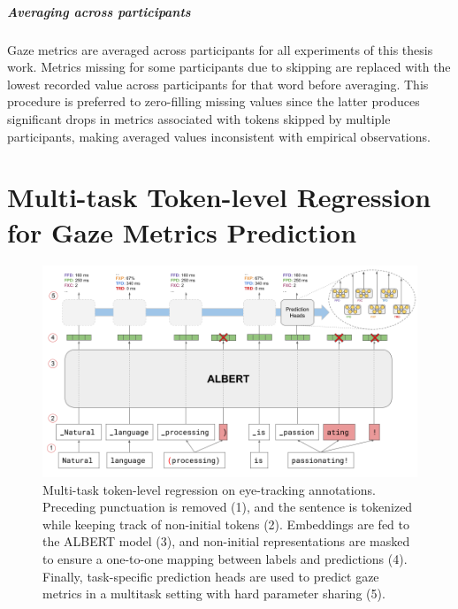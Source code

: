 \documentclass[a4paper, nobind]{templates/ociamthesis}
\begin{document}
\paragraph{Averaging across participants} Gaze metrics are averaged across participants for all experiments of this thesis work. Metrics missing for some participants due to skipping are replaced with the lowest recorded value across participants for that word before averaging. This procedure is preferred to zero-filling missing values since the latter produces significant drops in metrics associated with tokens skipped by multiple participants, making averaged values inconsistent with empirical observations.

\hypertarget{app:et-modeling}{%
\chapter{Multi-task Token-level Regression for Gaze Metrics Prediction}\label{app:et-modeling}}

\vspace{-3em}



\begin{figure}[H]

{\centering \includegraphics[width=1\linewidth]{figures/appendix/A3_multitask_et} 

}

\caption{Multi-task token-level regression on eye-tracking annotations. Preceding punctuation is removed (1), and the sentence is tokenized while keeping track of non-initial tokens (2). Embeddings are fed to the ALBERT model (3), and non-initial representations are masked to ensure a one-to-one mapping between labels and predictions (4). Finally, task-specific prediction heads are used to predict gaze metrics in a multitask setting with hard parameter sharing (5).}\label{fig:multitask-et}
\end{figure}
\end{document}
